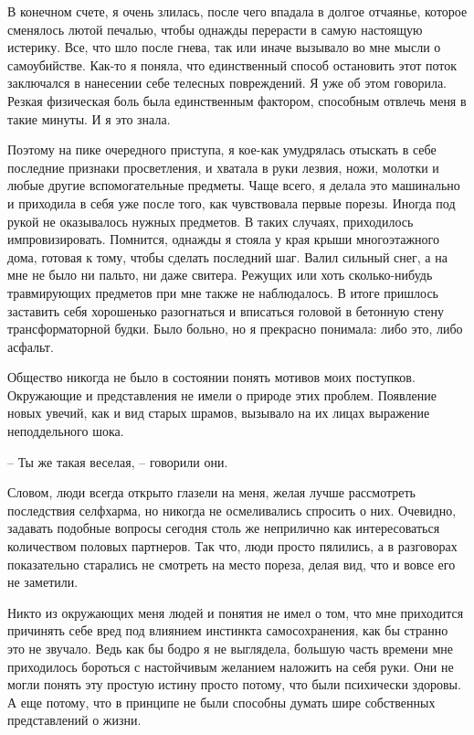 \documentclass[
]{book}
\begin{document}
В конечном счете, я очень злилась, после чего впадала в долгое отчаянье, которое сменялось лютой печалью, чтобы однажды перерасти в самую настоящую истерику. Все, что шло после гнева, так или иначе вызывало во мне мысли о самоубийстве. Как-то я поняла, что единственный способ остановить этот поток заключался в нанесении себе телесных повреждений. Я уже об этом говорила. Резкая физическая боль была единственным фактором, способным отвлечь меня в такие минуты. И я это знала.

Поэтому на пике очередного приступа, я кое-как умудрялась отыскать в себе последние признаки просветления, и хватала в руки лезвия, ножи, молотки и любые другие вспомогательные предметы. Чаще всего, я делала это машинально и приходила в себя уже после того, как чувствовала первые порезы. Иногда под рукой не оказывалось нужных предметов. В таких случаях, приходилось импровизировать. Помнится, однажды я стояла у края крыши многоэтажного дома, готовая к тому, чтобы сделать последний шаг. Валил сильный снег, а на мне не было ни пальто, ни даже свитера. Режущих или хоть сколько-нибудь травмирующих предметов при мне также не наблюдалось. В итоге пришлось заставить себя хорошенько разогнаться и вписаться головой в бетонную стену трансформаторной будки. Было больно, но я прекрасно понимала: либо это, либо асфальт.

Общество никогда не было в состоянии понять мотивов моих поступков. Окружающие и представления не имели о природе этих проблем. Появление новых увечий, как и вид старых шрамов, вызывало на их лицах выражение неподдельного шока.

-- Ты же такая веселая, -- говорили они.

Словом, люди всегда открыто глазели на меня, желая лучше рассмотреть последствия селфхарма, но никогда не осмеливались спросить о них. Очевидно, задавать подобные вопросы сегодня столь же неприлично как интересоваться количеством половых партнеров. Так что, люди просто пялились, а в разговорах показательно старались не смотреть на место пореза, делая вид, что и вовсе его не заметили.

Никто из окружающих меня людей и понятия не имел о том, что мне приходится причинять себе вред под влиянием инстинкта самосохранения, как бы странно это не звучало. Ведь как бы бодро я не выглядела, большую часть времени мне приходилось бороться с настойчивым желанием наложить на себя руки. Они не могли понять эту простую истину просто потому, что были психически здоровы. А еще потому, что в принципе не были способны думать шире собственных представлений о жизни.
\end{document}
